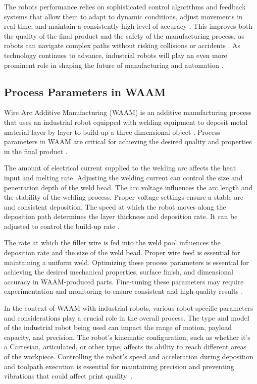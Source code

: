 \documentclass[ZLstudentexpose%
              ,optBiber%
              ,optEnglish%
              ,10pt
              ]{ZLlatex}%
\begin{document}
The robots performance relies on sophisticated control algorithms and feedback systems that allow them to adapt to dynamic conditions, adjust movements in real-time, and maintain a consistently high level of accuracy \cite{Lin.2023}. This improves both the quality of the final product and the safety of the manufacturing process, as robots can navigate complex paths without risking collisions or accidents \cite{Bosscher.2011}.
As technology continues to advance, industrial robots will play an even more prominent role in shaping the future of manufacturing and automation \cite{Domae.2019}.


\subsection{Process Parameters in WAAM}
Wire Arc Additive Manufacturing (WAAM) is an additive manufacturing process that uses an industrial robot equipped with welding equipment to deposit metal material layer by layer to build up a three-dimensional object \cite{Rodrigues.2019}. Process parameters in WAAM are critical for achieving the desired quality and properties in the final product \cite{Dinovitzer.2019}.

The amount of electrical current supplied to the welding arc affects the heat input and melting rate. Adjusting the welding current can control the size and penetration depth of the weld bead. The arc voltage influences the arc length and the stability of the welding process. Proper voltage settings ensure a stable arc and consistent deposition. The speed at which the robot moves along the deposition path determines the layer thickness and deposition rate. It can be adjusted to control the build-up rate \cite{Tomar.2022}.

The rate at which the filler wire is fed into the weld pool influences the deposition rate and the size of the weld bead. Proper wire feed is essential for maintaining a uniform weld. Optimizing these process parameters is essential for achieving the desired mechanical properties, surface finish, and dimensional accuracy in WAAM-produced parts. Fine-tuning these parameters may require experimentation and monitoring to ensure consistent and high-quality results \cite{Muller.2019}.

In the context of WAAM with industrial robots, various robot-specific parameters and considerations play a crucial role in the overall process. The type and model of the industrial robot being used can impact the range of motion, payload capacity, and precision. The robot's kinematic configuration, such as whether it's a Cartesian, articulated, or other type, affects its ability to reach different areas of the workpiece. Controlling the robot's speed and acceleration during deposition and toolpath execution is essential for maintaining precision and preventing vibrations that could affect print quality~\cite{Hsiao.2020}.
\end{document}
